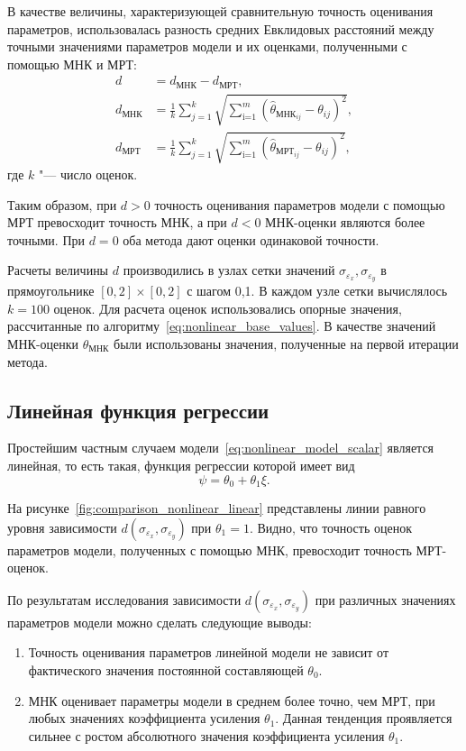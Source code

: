 В качестве величины, характеризующей сравнительную точность оценивания параметров,
использовалась разность средних Евклидовых расстояний
между точными значениями параметров модели и их оценками, полученными
с помощью МНК и МРТ:
\begin{equation*}
  \begin{aligned}
    d &= d_{\text{МНК}} - d_{\text{МРТ}}, \\
    d_{\text{МНК}} &=
    \frac{1}{k} \sum_{j=1}^k
    \sqrt{\sum_{\text{i=1}}^m (\hat{\theta}_{\text{МНК}_{ij}} - \theta_{ij})^2}, \\
    d_{\text{МРТ}} &=
    \frac{1}{k} \sum_{j=1}^k
    \sqrt{\sum_{\text{i=1}}^m (\hat{\theta}_{\text{МРТ}_{ij}} - \theta_{ij})^2},
  \end{aligned}
\end{equation*}
где \( k \) "--- число оценок.

Таким образом, при \( d > 0 \) точность оценивания параметров модели с помощью МРТ
превосходит точность МНК, а при \( d < 0 \) МНК-оценки являются более точными.
При \( d = 0 \) оба метода дают оценки одинаковой точности.

Расчеты величины \( d \) производились в узлах сетки значений
\( \sigma_{\varepsilon_x}, \sigma_{\varepsilon_y} \) в прямоугольнике
\( [0, 2] \times [0, 2] \) с шагом 0{,}1.
В каждом узле сетки вычислялось \( k = 100 \) оценок.
Для расчета оценок использовались опорные значения,
рассчитанные по алгоритму~\eqref{eq:nonlinear_base_values}.
В качестве значений МНК-оценки \( \theta_{\text{МНК}} \)
были использованы значения, полученные на первой итерации метода.

\pagebreak
\subsection{Линейная функция регрессии}

Простейшим частным случаем модели~\eqref{eq:nonlinear_model_scalar} является линейная,
то есть такая, функция регрессии которой имеет вид
\[ \psi = \theta_0 + \theta_1 \xi. \]

На рисунке~\ref{fig:comparison_nonlinear_linear}
представлены линии равного уровня зависимости \( d(\sigma_{\varepsilon_x}, \sigma_{\varepsilon_y}) \)
при \( \theta_1 = 1 \).
Видно, что точность оценок параметров модели, полученных с помощью МНК,
превосходит точность МРТ-оценок.

По результатам исследования зависимости \( d(\sigma_{\varepsilon_x}, \sigma_{\varepsilon_y}) \) при
различных значениях параметров модели можно сделать следующие выводы:
\begin{enumerate}
\item Точность оценивания параметров линейной модели не зависит
  от фактического значения постоянной составляющей \( \theta_0 \).
\item МНК оценивает параметры модели в среднем более точно, чем МРТ,
  при любых значениях коэффициента усиления \( \theta_1 \).
  Данная тенденция проявляется сильнее с ростом абсолютного значения
  коэффициента усиления \( \theta_1 \).
\end{enumerate}

